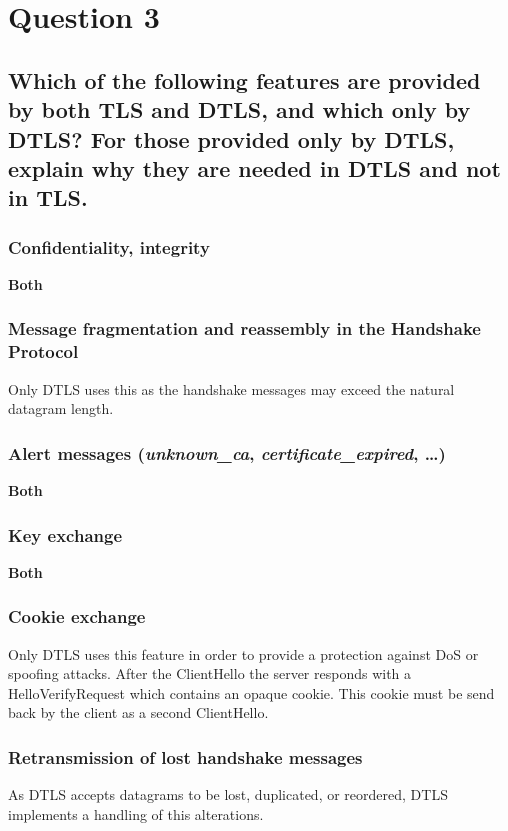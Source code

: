 \documentclass{report}
\begin{document}
	\section{Question 3}
	\startsection
		\renewcommand{\thesubsection}{\thesection.\Alph{subsection}}
		\subsection{Which of the following features are provided by both TLS and DTLS, and which only by DTLS? For those provided only by DTLS, explain why they are needed in DTLS and not in TLS.}
		\startsubsection
			\subsubsection{Confidentiality, integrity}
			\startsubsection
				\textbf{Both}
			\closesection
			\subsubsection{Message fragmentation and reassembly in the Handshake Protocol}
			\startsubsection
				Only DTLS uses this as the handshake messages may exceed the natural datagram length.
			\closesection
			\subsubsection{Alert messages (\textit{unknown\_ca}, \textit{certificate\_expired}, …)}
			\startsubsection
				\textbf{Both}
			\closesection
			\subsubsection{Key exchange}
			\startsubsection
				\textbf{Both}
			\closesection
			\subsubsection{Cookie exchange}
			\startsubsection
				Only DTLS uses this feature in order to provide a protection against DoS or spoofing attacks. After the ClientHello the server responds with a HelloVerifyRequest which contains an opaque cookie. This cookie must be send back by the client as a second ClientHello.
			\closesection
			\subsubsection{Retransmission of lost handshake messages}
			\startsubsection
				As DTLS accepts datagrams to be lost, duplicated, or reordered, DTLS implements a handling of this alterations.
			\closesection
		\closesection
	\closesection
\end{document}
